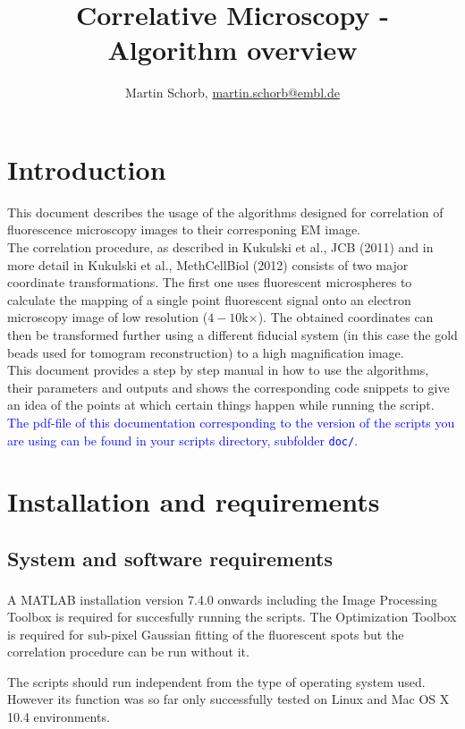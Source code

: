\documentclass[10pt,a4paper,onepage,DIV12]{scrartcl}
\title{Correlative Microscopy - Algorithm overview}
\author{Martin Schorb, \href{mailto:martin.schorb@embl.de}{martin.schorb@embl.de}}
\begin{document}
\maketitle
\tableofcontents
 \newpage
\section{Introduction}
This document describes the usage of the algorithms designed for correlation of fluorescence microscopy images to their corresponing EM image.\\

The correlation procedure, as described in Kukulski et al., JCB (2011) and in more detail in Kukulski et al., MethCellBiol (2012) consists of two major coordinate transformations. The first one uses fluorescent microspheres to calculate the mapping of a single point fluorescent signal onto an electron microscopy image of low resolution ($4-10 $k$\times$). The obtained coordinates can then be transformed further using a different fiducial system (in this case the gold beads used for tomogram reconstruction) to a high magnification image.\\

This document provides a step by step manual in how to use the algorithms, their parameters and outputs and shows the corresponding code snippets to give an idea of the points at which certain things happen while running the script.\\

\textcolor{blue}{The pdf-file of this documentation corresponding to the version of the scripts you are using can be found in your scripts directory, subfolder \texttt{doc/}.}
\section{Installation and requirements}

\subsection{System and software requirements}A MATLAB\textsuperscript{\textregistered} 
installation version 7.4.0 onwards including the Image Processing Toolbox is required for succesfully running the scripts. The Optimization Toolbox is required for sub-pixel Gaussian fitting of the fluorescent spots but the correlation procedure can be run without it. 

The scripts should run independent from the type of operating system used. However its function was so far only successfully tested on Linux and Mac OS X 10.4  environments. 
\\
\end{document}
